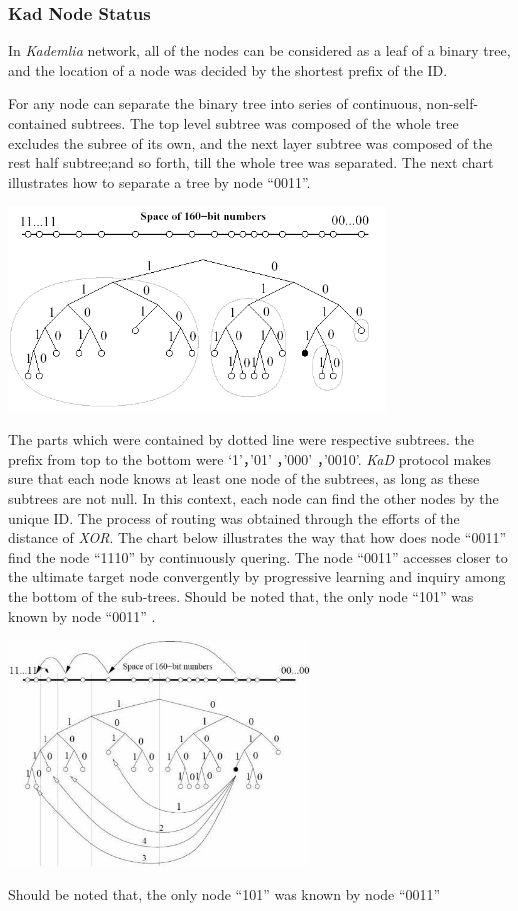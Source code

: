 \subsubsection{Kad Node Status}
{
In \emph{Kademlia} network, all of the nodes can be considered as a leaf of a binary tree, and the location of a node was decided by the shortest prefix of the ID.

For any node can separate the binary tree into series of continuous, non-self-contained subtrees.
The top level subtree was composed of the whole tree excludes the subree of its own, and the next layer subtree was composed of the rest half subtree;and so forth, till the whole tree was separated. The next chart illustrates how to separate a tree by node ``0011''.
\begin{center}
\includegraphics[width=10cm]{data/kadbintree.png}
\end{center}

The parts which were contained by dotted line were respective subtrees. the prefix from top to the bottom were `1'，'01' ，'000' ，'0010'.
\emph{KaD} protocol makes sure that each node knows at least one node of the subtrees, as long as these subtrees are not null.
In this context, each node can find the other nodes by the unique ID.
The process of routing was obtained through the efforts of the distance of \emph{XOR}.
The chart below illustrates the way that how does node ``0011'' find the node ``1110'' by continuously quering.
The node ``0011'' accesses closer to the ultimate target node convergently by progressive learning and inquiry among the bottom of the sub-trees.
Should be noted that, the only node ``101'' was known by node ``0011'' . 
\begin{center}
\includegraphics[width=8cm]{data/kademlialookup.jpg}
\end{center}
Should be noted that, the only node ``101'' was known by node ``0011'' 
}

